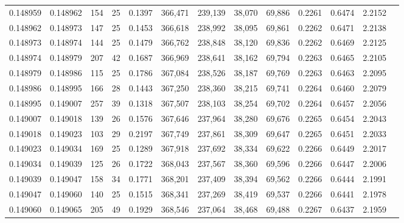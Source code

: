 \begin{tabular}{rrrrrrrrrrrrr}
0.148959 & 0.148962 & 154 &  25 &                                     0.1397 & 366,471 & 239,139 &  38,070 &  69,886 & 0.2261 & 0.6474 & 2.2152 \\
0.148962 & 0.148973 & 147 &  25 &                                     0.1453 & 366,618 & 238,992 &  38,095 &  69,861 & 0.2262 & 0.6471 & 2.2138 \\
0.148973 & 0.148974 & 144 &  25 &                                     0.1479 & 366,762 & 238,848 &  38,120 &  69,836 & 0.2262 & 0.6469 & 2.2125 \\
0.148974 & 0.148979 & 207 &  42 &                                     0.1687 & 366,969 & 238,641 &  38,162 &  69,794 & 0.2263 & 0.6465 & 2.2105 \\
0.148979 & 0.148986 & 115 &  25 &                                     0.1786 & 367,084 & 238,526 &  38,187 &  69,769 & 0.2263 & 0.6463 & 2.2095 \\
0.148986 & 0.148995 & 166 &  28 &                                     0.1443 & 367,250 & 238,360 &  38,215 &  69,741 & 0.2264 & 0.6460 & 2.2079 \\
0.148995 & 0.149007 & 257 &  39 &                                     0.1318 & 367,507 & 238,103 &  38,254 &  69,702 & 0.2264 & 0.6457 & 2.2056 \\
0.149007 & 0.149018 & 139 &  26 &                                     0.1576 & 367,646 & 237,964 &  38,280 &  69,676 & 0.2265 & 0.6454 & 2.2043 \\
0.149018 & 0.149023 & 103 &  29 &                                     0.2197 & 367,749 & 237,861 &  38,309 &  69,647 & 0.2265 & 0.6451 & 2.2033 \\
0.149023 & 0.149034 & 169 &  25 &                                     0.1289 & 367,918 & 237,692 &  38,334 &  69,622 & 0.2266 & 0.6449 & 2.2017 \\
0.149034 & 0.149039 & 125 &  26 &                                     0.1722 & 368,043 & 237,567 &  38,360 &  69,596 & 0.2266 & 0.6447 & 2.2006 \\
0.149039 & 0.149047 & 158 &  34 &                                     0.1771 & 368,201 & 237,409 &  38,394 &  69,562 & 0.2266 & 0.6444 & 2.1991 \\
0.149047 & 0.149060 & 140 &  25 &                                     0.1515 & 368,341 & 237,269 &  38,419 &  69,537 & 0.2266 & 0.6441 & 2.1978 \\
0.149060 & 0.149065 & 205 &  49 &                                     0.1929 & 368,546 & 237,064 &  38,468 &  69,488 & 0.2267 & 0.6437 & 2.1959 \\

\end{tabular}
